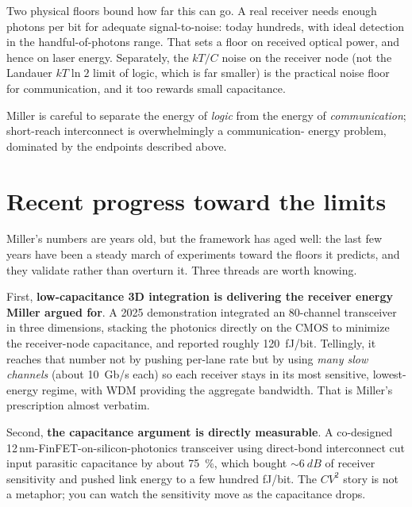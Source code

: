 Two physical floors bound how far this can go. A real receiver needs enough
photons per bit for adequate signal-to-noise: today hundreds, with ideal detection
in the handful-of-photons range. That sets a floor on received optical power, and
hence on laser energy. Separately, the $kT/C$ noise on the receiver node (not the
Landauer $kT\ln 2$ limit of logic, which is far smaller) is the practical noise
floor for communication, and it too rewards small capacitance.

Miller is careful to separate the energy of \emph{logic} from the energy of
\emph{communication}; short-reach interconnect is overwhelmingly a communication-%
energy problem, dominated by the endpoints described above.

\section{Recent progress toward the limits}
\label{sec:miller-recent}

Miller's numbers are years old, but the framework has aged well: the last few
years have been a steady march of experiments toward the floors it predicts, and
they validate rather than overturn it. Three threads are worth knowing.

First, \textbf{low-capacitance 3D integration is delivering the receiver energy
Miller argued for}. A 2025 demonstration integrated an 80-channel transceiver in
three dimensions, stacking the photonics directly on the CMOS to minimize the
receiver-node capacitance, and reported roughly \SI{120}{fJ/bit}. Tellingly, it reaches that number not by pushing per-lane rate but by using
\emph{many slow channels} (about \SI{10}{Gb/s} each) so each receiver stays in
its most sensitive, lowest-energy regime, with WDM providing the aggregate
bandwidth. That is Miller's prescription almost verbatim.

Second, \textbf{the capacitance argument is directly measurable}. A co-designed
12\,nm-FinFET-on-silicon-photonics transceiver using direct-bond interconnect cut
input parasitic capacitance by about \SI{75}{\percent}, which bought
$\sim\!\SI{6}{dB}$ of receiver sensitivity and pushed link energy to a few hundred
fJ/bit. The $C V^{2}$ story is not a metaphor; you can
watch the sensitivity move as the capacitance drops.

